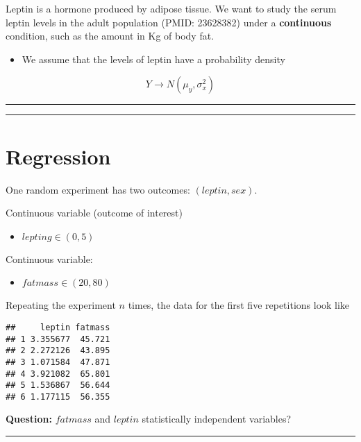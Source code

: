 \documentclass[
]{book}
\providecommand{\tightlist}{%
  \setlength{\itemsep}{0pt}\setlength{\parskip}{0pt}}
\begin{document}
Leptin is a hormone produced by adipose tissue. We want to study the serum leptin levels in the adult population (PMID: 23628382) under a \textbf{continuous} condition, such as the amount in Kg of body fat.

\begin{itemize}
\tightlist
\item
  We assume that the levels of leptin have a probability density
\end{itemize}

\[Y \rightarrow N(\mu_y, \sigma_x^2)\]

\begin{center}\rule{0.5\linewidth}{0.5pt}\end{center}

\begin{center}\rule{0.5\linewidth}{0.5pt}\end{center}

\hypertarget{regression-1}{%
\section{Regression}\label{regression-1}}

One random experiment has two outcomes: \((leptin, sex)\).

Continuous variable (outcome of interest)

\begin{itemize}
\tightlist
\item
  \(lepting \in (0, 5)\)
\end{itemize}

Continuous variable:

\begin{itemize}
\tightlist
\item
  \(fatmass \in (20,80)\)
\end{itemize}

Repeating the experiment \(n\) times, the data for the first five repetitions look like

\begin{verbatim}
##     leptin fatmass
## 1 3.355677  45.721
## 2 2.272126  43.895
## 3 1.071584  47.871
## 4 3.921082  65.801
## 5 1.536867  56.644
## 6 1.177115  56.355
\end{verbatim}

\textbf{Question:} \(fatmass\) and \(leptin\) statistically independent variables?

\begin{center}\rule{0.5\linewidth}{0.5pt}\end{center}
\end{document}
